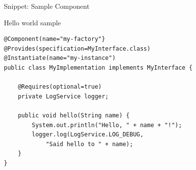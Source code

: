 \begin{frame}[fragile]{Snippet: Sample Component}
\begin{block}{Hello world sample}
\begin{verbatim}
@Component(name="my-factory"}
@Provides(specification=MyInterface.class)
@Instantiate(name="my-instance")
public class MyImplementation implements MyInterface {

	@Requires(optional=true)
	private LogService logger;
	
	public void hello(String name) {
		System.out.println("Hello, " + name + "!");
		logger.log(LogService.LOG_DEBUG,
			"Said hello to " + name);
	}
}
\end{verbatim}
\end{block}
\end{frame}
